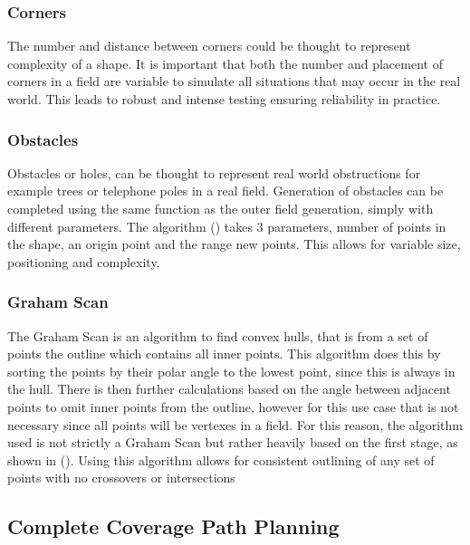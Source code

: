 \documentclass[final]{cmpreport_02}
\begin{document}
\subsubsection{Corners}
The number and distance between corners could be thought to represent complexity of a shape.
It is important that both the number and placement of corners in a field are variable to simulate all situations that may occur in the real world.
This leads to robust and intense testing ensuring reliability in practice.


\subsubsection{Obstacles}
Obstacles or holes, can be thought to represent real world obstructions for example trees or telephone poles in a real field.
Generation of obstacles can be completed using the same function as the outer field generation, simply with different parameters.
The algorithm () takes 3 parameters, number of points in the shape, an origin point and the range new points.
This allows for variable size, positioning and complexity.


\subsubsection{Graham Scan}
The Graham Scan \citep{graham1972efficient} is an algorithm to find convex hulls, that is from a set of points the outline which contains all inner points.
This algorithm does this by sorting the points by their polar angle to the lowest point, since this is always in the hull.
There is then further calculations based on the angle between adjacent points to omit inner points from the outline, however for this use case that is not necessary since all points will be vertexes in a field.
For this reason, the algorithm used is not strictly a Graham Scan but rather heavily based on the first stage, as shown in ().
Using this algorithm allows for consistent outlining of any set of points with no crossovers or intersections

\subsection{Complete Coverage Path Planning}
\end{document}
